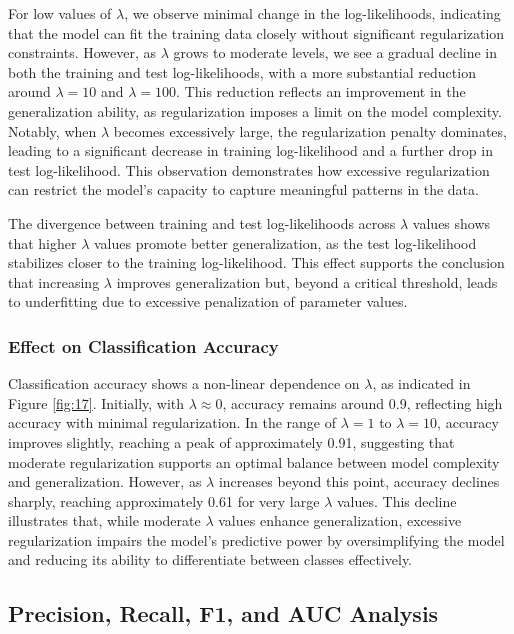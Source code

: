 \documentclass[a4paper,oneside,bibliography=totoc]{scrartcl}
\begin{document}
For low values of $\lambda$, we observe minimal change in the log-likelihoods, indicating that the model can fit the training data closely without significant regularization constraints. However, as $\lambda$ grows to moderate levels, we see a gradual decline in both the training and test log-likelihoods, with a more substantial reduction around $\lambda = 10$ and $\lambda = 100$. This reduction reflects an improvement in the generalization ability, as regularization imposes a limit on the model complexity. Notably, when $\lambda$ becomes excessively large, the regularization penalty dominates, leading to a significant decrease in training log-likelihood and a further drop in test log-likelihood. This observation demonstrates how excessive regularization can restrict the model’s capacity to capture meaningful patterns in the data.

The divergence between training and test log-likelihoods across $\lambda$ values shows that higher $\lambda$ values promote better generalization, as the test log-likelihood stabilizes closer to the training log-likelihood. This effect supports the conclusion that increasing $\lambda$ improves generalization but, beyond a critical threshold, leads to underfitting due to excessive penalization of parameter values.

\subsubsection{Effect on Classification Accuracy}

Classification accuracy shows a non-linear dependence on $\lambda$, as indicated in Figure \ref{fig:17}. Initially, with $\lambda \approx 0$, accuracy remains around 0.9, reflecting high accuracy with minimal regularization. In the range of $\lambda = 1$ to $\lambda = 10$, accuracy improves slightly, reaching a peak of approximately 0.91, suggesting that moderate regularization supports an optimal balance between model complexity and generalization. However, as $\lambda$ increases beyond this point, accuracy declines sharply, reaching approximately 0.61 for very large $\lambda$ values. This decline illustrates that, while moderate $\lambda$ values enhance generalization, excessive regularization impairs the model’s predictive power by oversimplifying the model and reducing its ability to differentiate between classes effectively.

\subsection{Precision, Recall, F1, and AUC Analysis}
\end{document}

